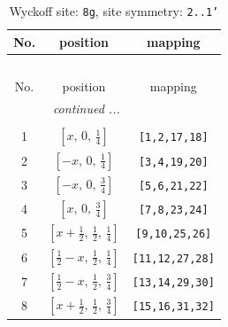 \documentclass[fleqn,8pt]{jsarticle}
\begin{document}
\renewcommand{\arraystretch}{1.2}
\begin{longtable}{ccc}
\caption{Wyckoff site: {\tt 8g}, site symmetry: {\tt 2..1'}}
 \\
 \hline \hline
No. & position & mapping \\ \hline \endfirsthead

\multicolumn{2}{l}{\tablename\ \thetable{}} \\
 \hline \hline
No. & position & mapping \\ \hline \endhead

 \hline \hline
\multicolumn{2}{r}{\footnotesize\it continued ...} \\ \endfoot

 \hline \hline
\multicolumn{2}{r}{} \\ \endlastfoot

1 & $\left[ x,\, 0,\, \frac{1}{4} \right]$ & {\tt [1,2,17,18]} \\ \hline
2 & $\left[ - x,\, 0,\, \frac{1}{4} \right]$ & {\tt [3,4,19,20]} \\ \hline
3 & $\left[ - x,\, 0,\, \frac{3}{4} \right]$ & {\tt [5,6,21,22]} \\ \hline
4 & $\left[ x,\, 0,\, \frac{3}{4} \right]$ & {\tt [7,8,23,24]} \\ \hline
5 & $\left[ x + \frac{1}{2},\, \frac{1}{2},\, \frac{1}{4} \right]$ & {\tt [9,10,25,26]} \\ \hline
6 & $\left[ \frac{1}{2} - x,\, \frac{1}{2},\, \frac{1}{4} \right]$ & {\tt [11,12,27,28]} \\ \hline
7 & $\left[ \frac{1}{2} - x,\, \frac{1}{2},\, \frac{3}{4} \right]$ & {\tt [13,14,29,30]} \\ \hline
8 & $\left[ x + \frac{1}{2},\, \frac{1}{2},\, \frac{3}{4} \right]$ & {\tt [15,16,31,32]} \\
\end{longtable}
\renewcommand{\arraystretch}{1.2}
\end{document}
